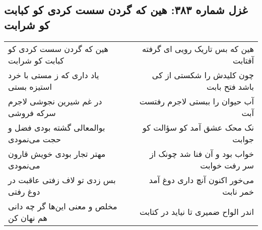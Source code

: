 \begin{center}
\section*{غزل شماره ۳۸۳: هین که گردن سست کردی کو کبابت کو شرابت}
\label{sec:0383}
\begin{longtable}{l p{0.5cm} r}
هین که گردن سست کردی کو کبابت کو شرابت
&&
هین که بس تاریک رویی ای گرفته آفتابت
\\
یاد داری که ز مستی با خرد استیزه بستی
&&
چون کلیدش را شکستی از کی باشد فتح بابت
\\
در غم شیرین نجوشی لاجرم سرکه فروشی
&&
آب حیوان را ببستی لاجرم رفتست آبت
\\
بوالمعالی گشته بودی فضل و حجت می‌نمودی
&&
نک محک عشق آمد کو سؤالت کو جوابت
\\
مهتر تجار بودی خویش قارون می‌نمودی
&&
خواب بود و آن فنا شد چونک از سر رفت خوابت
\\
بس زدی تو لاف زفتی عاقبت در دوغ رفتی
&&
می‌خور اکنون آنچ داری دوغ آمد خمر نابت
\\
مخلص و معنی این‌ها گر چه دانی هم نهان کن
&&
اندر الواح ضمیری تا نیاید در کتابت
\\
\end{longtable}
\end{center}
